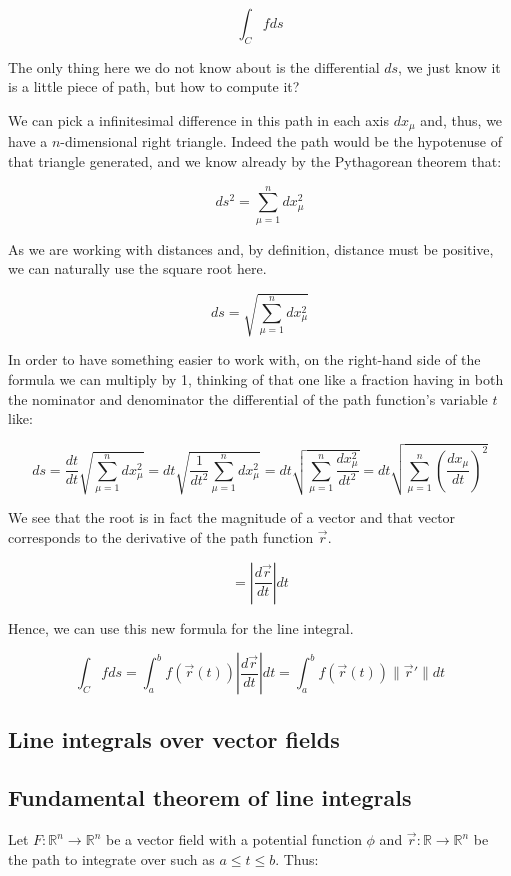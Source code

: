 \documentclass[12pt]{article}
\begin{document}
	\[
		\int_C f ds
	\]
	
	The only thing here we do not know about is the differential $ds$, we just know it is a little piece of path, but how to compute it?
	
	We can pick a infinitesimal difference in this path in each axis $dx_\mu$ and, thus, we have a $n$-dimensional right triangle. Indeed the path would be the hypotenuse of that triangle generated, and we know already by the Pythagorean theorem that:
	
	\[
		ds^2 = \sum_{\mu = 1}^n dx_\mu^2
	\]
	
	As we are working with distances and, by definition, distance must be positive, we can naturally use the square root here.
	
	\[
		ds = \sqrt{\sum_{\mu = 1}^n dx_\mu^2}
	\]
	
	In order to have something easier to work with, on the right-hand side of the formula we can multiply by 1, thinking of that one like a fraction having in both the nominator and denominator the differential of the path function's variable $t$ like:
	
	\[
		ds = \frac{dt}{dt} \sqrt{\sum_{\mu = 1}^n dx_\mu^2} 
		= dt \sqrt{\frac{1}{dt^2}\sum_{\mu = 1}^n dx_\mu^2}
		= dt \sqrt{\sum_{\mu = 1}^n \frac{dx_\mu^2}{dt^2}}
		= dt \sqrt{\sum_{\mu = 1}^n \left(\frac{dx_\mu}{dt}\right)^2}
	\]
	
	We see that the root is in fact the magnitude of a vector and that vector corresponds to the derivative of the path function $\vec{r}$.
	
	\[
		= \left| \frac{d\vec{r}}{dt} \right| dt
	\]
	
	Hence, we can use this new formula for the line integral.
	
	\[
		\int_C f ds
		= \int_a^b f(\vec{r}(t)) \left| \frac{d\vec{r}}{dt} \right| dt
		= \int_a^b f(\vec{r}(t)) \|\vec{r}'\| dt
	\]
	
	\subsection{Line integrals over vector fields}
	
	\subsection{Fundamental theorem of line integrals}
	
	Let $F : \mathbb{R}^n \to \mathbb{R}^n$ be a vector field with a potential function $\phi$ and $\vec{r} : \mathbb{R} \to \mathbb{R}^n$ be the path to integrate over such as $a \le t \le b$. Thus:
	
\end{document}
